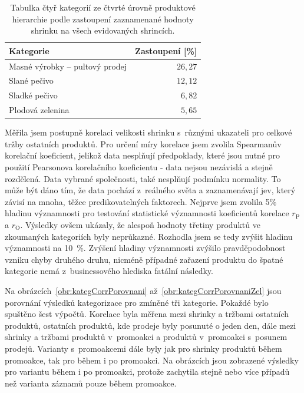 \begin{table}[h!]
    \centering
    \captionsetup{justification=centering}
    \caption{Tabulka čtyř kategorií ze čtvrté úrovně produktové hierarchie podle zastoupení zaznamenané hodnoty shrinku na všech evidovaných shrincích.}
    \begin{tabular}{l r}
        Kategorie & Zastoupení [\%] \\

    \hline
    Masné výrobky -- pultový prodej &$ 26{,}27$ \\
    Slané pečivo&  $12{,}12$\\
    Sladké pečivo&   $6{,}82$\\
    Plodová zelenina&   $5{,}65$\\
    \end{tabular}
    \label{tab:lostcost4}
    \end{table}

Měřila jsem postupně korelaci velikosti shrinku s~různými ukazateli pro celkové tržby ostatních produktů. Pro určení míry korelace jsem zvolila Spearmanův korelační koeficient, jelikož data nesplňují předpoklady, které jsou nutné pro použití Pearsonova korelačního koeficientu - data nejsou nezávislá a stejně rozdělená. Data vybrané společnosti, také nesplňují podmínku normality. To může být dáno tím, že data pochází z~reálného světa a zaznamenávají jev, který závisí na mnoha, těžce predikovatelných faktorech. Nejprve jsem zvolila 5\% hladinu významnosti pro testování statistické významnosti koeficientů korelace $r_\mathrm{P}$ a $r_\mathrm{O}$. Výsledky ovšem ukázaly, že alespoň hodnoty třetiny produktů ve zkoumaných kategoriích  byly neprůkazné. Rozhodla jsem se tedy zvýšit hladinu významnosti na 10~\%. Zvýšení hladiny významnosti zvýšilo pravděpodobnost vzniku chyby druhého druhu, nicméně případné zařazení produktu do špatné kategorie nemá z~businessového hlediska fatální následky.

Na obrázcích~\ref*{obr:kategCorrPorovnani} až~\ref*{obr:kategCorrPorovnaniZel} jsou porovnání výsledků kategorizace pro zmíněné tři kategorie. Pokaždé bylo spuštěno šest výpočtů. Korelace byla měřena mezi shrinky a tržbami ostatních produktů, ostatních produktů, kde prodeje byly posunuté o jeden den, dále mezi shrinky a tržbami produktů v~promoakci a produktů v~promoakci s~posunem prodejů. Varianty s~promoakcemi dále byly jak pro shrinky produktů během promoakce, tak pro během i po promoakci. Na obrázcích jsou zobrazené výsledky pro variantu během i po promoakci, protože zachytila stejně nebo více případů než varianta záznamů pouze během promoakce. 

